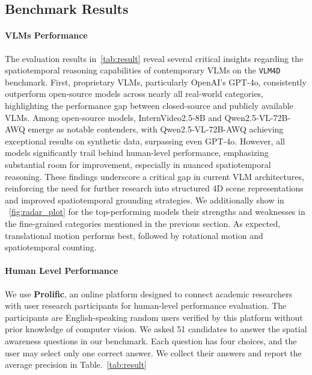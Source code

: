 \subsection{Benchmark Results}
\paragraph{VLMs Performance} The evaluation results in~\cref{tab:result} reveal several critical insights regarding the spatiotemporal reasoning capabilities of contemporary VLMs on the \texttt{VLM4D} benchmark. First, proprietary VLMs, particularly OpenAI’s GPT-4o, consistently outperform open-source models across nearly all real-world categories, highlighting the performance gap between closed-source and publicly available VLMs. Among open-source models, InternVideo2.5-8B and Qwen2.5-VL-72B-AWQ emerge as notable contenders, with Qwen2.5-VL-72B-AWQ achieving exceptional results on synthetic data, surpassing even GPT-4o. However, all models significantly trail behind human-level performance, emphasizing substantial room for improvement, especially in nuanced spatiotemporal reasoning. These findings underscore a critical gap in current VLM architectures, reinforcing the need for further research into structured 4D scene representations and improved spatiotemporal grounding strategies. We additionally show in ~\cref{fig:radar_plot} for the top-performing models their strengths and weaknesses in the fine-grained categories mentioned in the previous section. As expected, translational motion performs best, followed by rotational motion and spatiotemporal counting. 

\paragraph{Human Level Performance}
We use \textbf{Prolific}, an online platform designed to connect academic researchers with user research participants for human-level performance evaluation. The participants are English-speaking random users verified by this platform without prior knowledge of computer vision. We asked 51 candidates to answer the spatial awareness questions in our benchmark. Each question has four choices, and the user may select only one correct answer. We collect their answers and report the average precision in Table.~\ref{tab:result}





